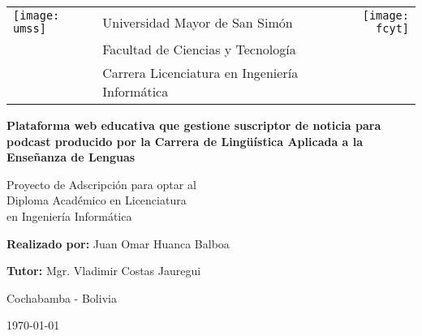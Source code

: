\hypertarget{TitlePage}{}

\begin{titlepage}
	
	\begin{tabular}[t]{l p{11cm} r}
	\texttt{[image: umss]} & \centering \large{Universidad Mayor de San Simón} &	\texttt{[image: fcyt]} \\
		& \centering \large{Facultad de Ciencias y Tecnología} & \\
		& \centering \large{Carrera Licenciatura en Ingeniería Informática} & \\
	\end{tabular}
	
	
	\begin{center}
		\normalsize
		
		\vspace{1.5cm}
		\Large{
		\textbf{Plataforma web educativa que gestione suscriptor de noticia para podcast producido por la Carrera de Lingüística Aplicada a la Enseñanza de Lenguas} 
		}		\\
	
		\vspace{1.5cm}
	
		\small
	\end{center}
		
	\begin{flushright}
	
		Proyecto de Adscripción para optar al \\ 
		Diploma Académico en Licenciatura \\ 
		en Ingeniería Informática	
		
	\end{flushright}
	
	\begin{center}
		
		\vspace{1.5cm}
			
		\textbf{Realizado por:} Juan Omar Huanca Balboa \\
	
		\vspace{1.5cm}
	
		\textbf{Tutor:} Mgr. Vladimir Costas Jauregui \\
		
		\vspace{1.5cm}
		
		Cochabamba - Bolivia
	
		\vspace{1.5cm}
					
		\monthYear\today
		
	\end{center}			

\end{titlepage}